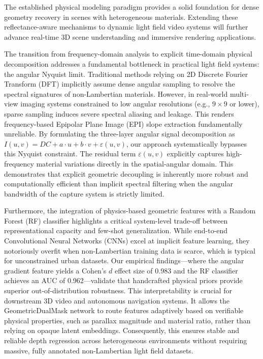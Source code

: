 \documentclass[lettersize,journal]{IEEEtran}
\begin{document}
The established physical modeling paradigm provides a solid foundation for dense geometry recovery in scenes with heterogeneous materials. Extending these reflectance-aware mechanisms to dynamic light field video systems will further advance real-time 3D scene understanding and immersive rendering applications.

The transition from frequency-domain analysis to explicit time-domain physical decomposition addresses a fundamental bottleneck in practical light field systems: the angular Nyquist limit. Traditional methods relying on 2D Discrete Fourier Transform (DFT) implicitly assume dense angular sampling to resolve the spectral signatures of non-Lambertian materials. However, in real-world multi-view imaging systems constrained to low angular resolutions (e.g., $9 \times 9$ or lower), sparse sampling induces severe spectral aliasing and leakage. This renders frequency-based Epipolar Plane Image (EPI) slope extraction fundamentally unreliable. By formulating the three-layer angular signal decomposition as $I(u,v) = DC + a\cdot u + b\cdot v + \varepsilon(u,v)$, our approach systematically bypasses this Nyquist constraint. The residual term $\varepsilon(u,v)$ explicitly captures high-frequency material variations directly in the spatial-angular domain. This demonstrates that explicit geometric decoupling is inherently more robust and computationally efficient than implicit spectral filtering when the angular bandwidth of the capture system is strictly limited.

Furthermore, the integration of physics-based geometric features with a Random Forest (RF) classifier highlights a critical system-level trade-off between representational capacity and few-shot generalization. While end-to-end Convolutional Neural Networks (CNNs) excel at implicit feature learning, they notoriously overfit when non-Lambertian training data is scarce, which is typical for unconstrained urban datasets. Our empirical findings---where the angular gradient feature yields a Cohen's $d$ effect size of 0.983 and the RF classifier achieves an AUC of 0.962---validate that handcrafted physical priors provide superior out-of-distribution robustness. This interpretability is crucial for downstream 3D video and autonomous navigation systems. It allows the GeometricDualMask network to route features adaptively based on verifiable physical properties, such as parallax magnitude and material ratio, rather than relying on opaque latent embeddings. Consequently, this ensures stable and reliable depth regression across heterogeneous environments without requiring massive, fully annotated non-Lambertian light field datasets.
\end{document}
